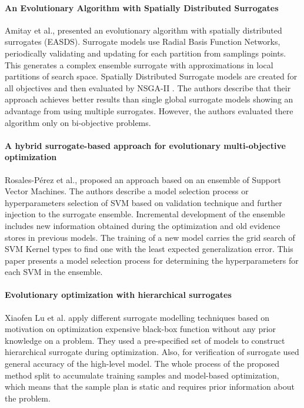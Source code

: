         \paragraph{An Evolutionary Algorithm with Spatially Distributed Surrogates} Amitay et al.,\cite{DistrSurr} presented an evolutionary algorithm with spatially distributed surrogates (EASDS). Surrogate models use Radial Basis Function Networks, periodically validating and updating for each partition from samplings points. This generates a complex ensemble surrogate with approximations in local partitions of search space. Spatially Distributed Surrogate models are created for all objectives and then evaluated by NSGA-II \cite{DistrSurr}. The authors describe that their approach achieves better results than single global surrogate models showing an advantage from using multiple surrogates. However, the authors evaluated there algorithm only on bi-objective problems.

        \paragraph{A hybrid surrogate-based approach for evolutionary multi-objective optimization} Rosales-Pérez et al.,\cite{HybridSurrRCG} proposed an approach based on an ensemble of Support Vector Machines. The authors describe a model selection process or hyperparameters selection of SVM based on validation technique and further injection to the surrogate ensemble. Incremental development of the ensemble includes new information obtained during the optimization and old evidence stores in previous models. The training of a new model carries the grid search of SVM Kernel types to find one with the least expected generalization error. This paper presents a model selection process for determining the hyperparameters for each SVM in the ensemble.


        \paragraph{Evolutionary optimization with hierarchical surrogates} Xiaofen Lu et al. \cite{LuST19} apply different surrogate modelling techniques based on motivation on optimization expensive black-box function without any prior knowledge on a problem. They used a pre-specified set of models to construct hierarchical surrogate during optimization. Also, for verification of surrogate used general accuracy of the high-level model. The whole process of the proposed method split to accumulate training samples and model-based optimization, which means that the sample plan is static and requires prior information about the problem. 

